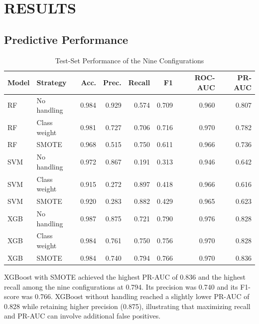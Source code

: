 \documentclass[conference]{IEEEtran}
\begin{document}
\section{RESULTS}

\subsection{Predictive Performance}

\begin{table}[!t]
\centering
\caption{Test-Set Performance of the Nine Configurations}
\label{tab:performance}
\small
\begin{tabular}{|l|l|r|r|r|r|r|r|}
\hline
\textbf{Model} & \textbf{Strategy} & \textbf{Acc.} & \textbf{Prec.} & \textbf{Recall} & \textbf{F1} & \textbf{ROC-AUC} & \textbf{PR-AUC} \\
\hline
RF & No handling & 0.984 & 0.929 & 0.574 & 0.709 & 0.960 & 0.807 \\
RF & Class weight & 0.981 & 0.727 & 0.706 & 0.716 & 0.970 & 0.782 \\
RF & SMOTE & 0.968 & 0.515 & 0.750 & 0.611 & 0.966 & 0.736 \\
SVM & No handling & 0.972 & 0.867 & 0.191 & 0.313 & 0.946 & 0.642 \\
SVM & Class weight & 0.915 & 0.272 & 0.897 & 0.418 & 0.966 & 0.616 \\
SVM & SMOTE & 0.920 & 0.283 & 0.882 & 0.429 & 0.965 & 0.623 \\
XGB & No handling & 0.987 & 0.875 & 0.721 & 0.790 & 0.976 & 0.828 \\
XGB & Class weight & 0.984 & 0.761 & 0.750 & 0.756 & 0.970 & 0.828 \\
XGB & SMOTE & 0.984 & 0.740 & 0.794 & 0.766 & 0.970 & 0.836 \\
\hline
\end{tabular}
\end{table}

XGBoost with SMOTE achieved the highest PR-AUC of 0.836 and the highest recall among the nine configurations at 0.794. Its precision was 0.740 and its F1-score was 0.766. XGBoost without handling reached a slightly lower PR-AUC of 0.828 while retaining higher precision (0.875), illustrating that maximizing recall and PR-AUC can involve additional false positives.
\end{document}
